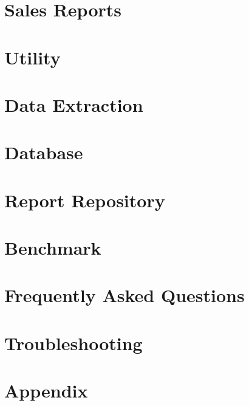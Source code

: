 \documentclass{book}
\begin{document}
\chapter{Sales Reports}
\label{sales_reports}
\hypertarget{sales_reports}{}

%
%
\chapter{Utility}
\label{utility}
\hypertarget{utility}{}

%
%
\chapter{Data Extraction}
\label{data_extract}
\hypertarget{data_extract}{}

%
%
\chapter{Database}
\label{database}
\hypertarget{database}{}

%
%
\chapter{Report Repository}
\label{report_repository}
\hypertarget{report_repository}{}

%
%
\chapter{Benchmark}
\label{benchmark}
\hypertarget{benchmark}{}

%
%
\chapter{Frequently Asked Questions}
\label{faq}
\hypertarget{faq}{}

%
%
\chapter{Troubleshooting}
\label{troubleshooting}
\hypertarget{troubleshooting}{}

%
%
\chapter{Appendix}
\label{appendix}
\hypertarget{appendix}{}


\newpage 

\printindex
\end{document}

